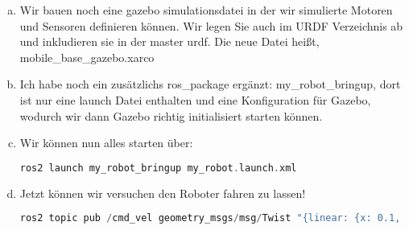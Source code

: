 \documentclass[a4paper,12pt]{article}
\begin{document}
\begin{enumerate}[a)]
{\begin{lstlisting}[language=C++,basicstyle=\fontsize{6.5}{8}\selectfont]
    <joint name="base_joint" type="fixed">
        <parent link="base_footprint" />
        <child link="base_link" />
        <origin xyz="0 0 ${wheel_radius}" rpy="0 0 0" />
    </joint>

    <joint name="base_right_wheel_joint" type="continuous">
        <parent link="base_link" />
        <child link="right_wheel_link" />
        <origin xyz="${-base_length / 4.0} ${-(base_width + wheel_length) / 2.0} 0" rpy="0 0 0" />
        <axis xyz="0 1 0" />
    </joint>

    <joint name="base_left_wheel_joint" type="continuous">
        <parent link="base_link" />
        <child link="left_wheel_link" />
        <origin xyz="${-base_length / 4.0} ${(base_width + wheel_length) / 2.0} 0" rpy="0 0 0" />
        <axis xyz="0 1 0" />
    </joint>

    <joint name="base_caster_wheel_joint" type="fixed">
        <parent link="base_link" />
        <child link="caster_wheel_link" />
        <origin xyz="${base_length / 3.0} 0 ${-wheel_radius / 2.0}" rpy="0 0 0" />
    </joint>

</robot>
\end{lstlisting}
}
\item{Wir bauen noch eine gazebo simulationsdatei in der wir simulierte Motoren und Sensoren definieren können. Wir legen Sie auch im URDF Verzeichnis ab und inkludieren sie in der master urdf. Die neue Datei heißt, mobile\_base\_gazebo.xarco}
\item{Ich habe noch ein zusätzlichs ros\_package ergänzt: my\_robot\_bringup, dort ist nur eine launch Datei enthalten und eine Konfiguration für Gazebo, wodurch wir dann Gazebo richtig initialisiert starten können.}
\item{Wir können nun alles starten über:
\begin{lstlisting}[language=C++,basicstyle=\fontsize{6.5}{8}\selectfont]
ros2 launch my_robot_bringup my_robot.launch.xml
\end{lstlisting}
}
\item{
Jetzt können wir versuchen den Roboter fahren zu lassen!
\begin{lstlisting}[language=C++,basicstyle=\fontsize{6.5}{8}\selectfont]
ros2 topic pub /cmd_vel geometry_msgs/msg/Twist "{linear: {x: 0.1, y: 0.0, z: 0.0}, angular: {x: 0.0, y: 0.0, z: 1.0}}"
\end{lstlisting}
}
\end{enumerate}
\end{document}
